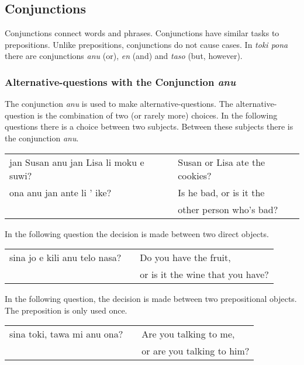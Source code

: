 \subsection*{Conjunctions}
%
%
Conjunctions connect words and phrases. 
Conjunctions have similar tasks to prepositions.
Unlike prepositions, conjunctions do not cause cases.
In \textit{toki pona} there are conjunctions \textit{anu} (or),  \textit{en} (and) and \textit{taso} (but, however).

%
\subsubsection*{Alternative-questions with the Conjunction \textit{anu}}
%
%
The conjunction \textit{anu} is used to make alternative-questions. 
The alternative-question is the combination of two (or rarely more) choices. 
In the following questions there is a choice between two subjects. 
Between these subjects there is the conjunction \textit{anu}. 

\begin{supertabular}{p{5,5cm}|ll}
jan Susan anu jan Lisa li moku e suwi?  && Susan or Lisa ate the cookies? \\
ona anu jan ante li ' ike? && Is he bad, or is it the \\ && other person who's bad? \\
\end{supertabular} 

In the following question the decision is made between two direct objects. 

\begin{supertabular}{p{5,5cm}|ll}
sina jo e kili anu telo nasa? && Do you have the fruit, \\ && or is it the wine that you have? \\
\end{supertabular} 

In the following question, the decision is made between two prepositional objects. 
The preposition is only used once. 

\begin{supertabular}{p{5,5cm}|ll}
sina toki, tawa mi anu ona? && Are you talking to me, \\ && or are you talking to him? \\
\end{supertabular} 

